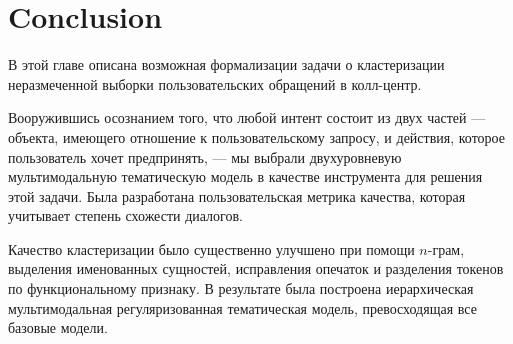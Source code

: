 \section{Conclusion}

В этой главе описана возможная формализации задачи о кластеризации неразмеченной выборки пользовательских обращений в колл-центр.

Вооружившись осознанием того, что любой интент состоит из двух частей --- объекта, имеющего отношение к пользовательскому запросу, и действия, которое пользователь хочет предпринять, --- мы выбрали двухуровневую мультимодальную тематическую модель в качестве инструмента для решения этой задачи. Была разработана пользовательская метрика качества, которая учитывает степень схожести диалогов.

Качество кластеризации было существенно улучшено при помощи $n$-грам, выделения именованных сущностей, исправления опечаток и разделения токенов по функциональному признаку. В результате была построена иерархическая мультимодальная регуляризованная тематическая модель, превосходящая все базовые модели.

